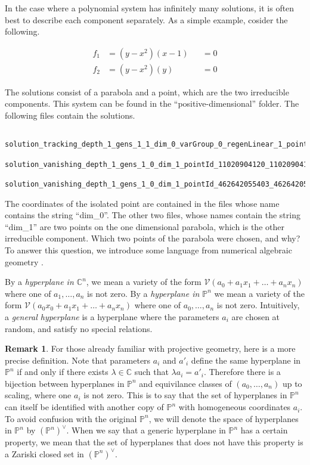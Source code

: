 \documentclass[12pt]{article}
\theoremstyle{definition}
\newtheorem{remark}{Remark}[section]
\newcommand{\C}{\mathbb{C}}
\newcommand{\PP}{\mathbb{P}}
\begin{document}
In the case where a polynomial system has infinitely many solutions, it is 
often best to describe each component separately. As a simple example, 
cosider the following.

\begin{align*}
   f_1 &= (y-x^2)(x-1) &&= 0\\
   f_2 &= (y-x^2)(y) &&= 0
\end{align*}

The solutions consist of a parabola and a point, which are the two 
irreducible components. This system can be found in the 
``positive-dimensional'' folder. The following files contain the solutions.
\begin{leftbar}
\vspace{-10pt} 
\begin{verbatim}
      solution_tracking_depth_1_gens_1_1_dim_0_varGroup_0_regenLinear_1_pointId_151979748598_138051236175
      solution_vanishing_depth_1_gens_1_0_dim_1_pointId_11020904120_11020904120
      solution_vanishing_depth_1_gens_1_0_dim_1_pointId_462642055403_462642055403
\end{verbatim}\vspace{-10pt} 
\end{leftbar}

The coordinates of the isolated point are contained in the files whose 
name contains the string ``dim\_0''. The other two files, whose names 
contain the string ``dim\_1'' are two points on the one dimensional 
parabola, which is the other irreducible component. Which two points of 
the parabola were chosen, and why? To answer this question, we introduce 
some language from numerical algebraic geometry \cite{BertiniBook}.

By a \emph{hyperplane in $\C^n$}, we mean a variety of the form 
$\mathcal{V}(a_0 + a_1x_1 + \ldots + a_nx_n)$ where one of $a_1, \ldots, 
a_n$ is not zero. By a \emph{hyperplane in 
$\PP^n$} we mean a variety of the form $\mathcal{V}(a_0x_0 + a_1x_1 
+ \ldots + a_nx_n)$ where one of $a_0, \ldots, a_n$ is not zero. 
Intuitively, a \emph{general hyperplane} is a 
hyperplane where the parameters $a_i$ are chosen at random, and satisfy 
no special relations. 

\begin{remark}
For those already familiar with projective geometry, 
here is a more precise definition. Note that 
parameters $a_i$ and $a'_i$ define the same hyperplane in $\PP^n$ if and 
only if there exists $\lambda \in \C$ such that $\lambda a_i = a'_i$. Therefore 
there is a bijection between hyperplanes in $\PP^n$ and equivilance 
classes of $(a_0, \ldots, a_n)$ up to scaling, where one $a_i$ is not 
zero. This is to say that the set of hyperplanes in $\PP^n$ can itself be 
identified with another copy of $\PP^n$ with homogeneous coordinates 
$a_i$. To avoid confusion with the original $\PP^n$, we will denote the 
space of hyperplanes in $\PP^n$ by $(\PP^n)^\vee$. When we say that a 
generic hyperplane in $\PP^n$ has a certain property, we mean that the 
set of hyperplanes that does not have this property is a Zariski closed 
set in $(\PP^n)^\vee$.
\end{remark}
\end{document}
